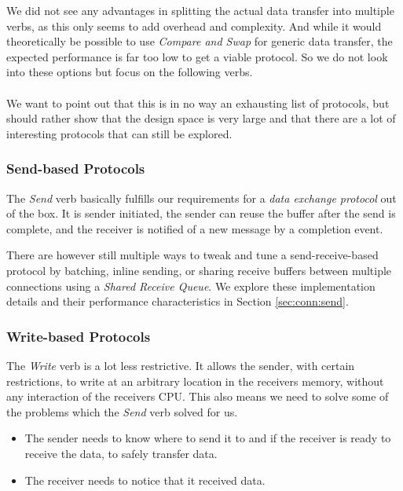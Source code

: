 We did not see any advantages in splitting the actual data transfer into multiple verbs, as this only seems to add overhead 
and complexity. And while it would theoretically be possible to use \emph{Compare and Swap} for generic data transfer,
the expected performance is far too low to get a viable protocol. So we do not look into these options but focus on the 
following verbs.

\paragraph{} We want to point out that this is in no way an exhausting list of protocols, but should rather show that the 
design space is very large and that there are a lot of interesting protocols that can still be explored.

\subsubsection{Send-based Protocols}
The \emph{Send} verb basically fulfills our requirements for a \emph{data exchange protocol} out of the box. It is sender
initiated, the sender can reuse the buffer after the send is complete, and the receiver is notified of a new message by
a completion event.

There are however still multiple ways to tweak and tune a send-receive-based protocol by batching, inline sending, or 
sharing receive buffers between multiple connections using a \emph{Shared Receive Queue}. We explore these implementation 
details and their performance characteristics in Section \ref{sec:conn:send}.

\subsubsection{Write-based Protocols}
The \emph{Write} verb is a lot less restrictive. It allows the sender, with certain restrictions, to write at an arbitrary 
location in the receivers memory, without any interaction of the receivers CPU. This also means we need to solve some of the 
problems which the \emph{Send} verb solved for us.

\begin{itemize}
  \item The sender needs to know where to send it to and if the receiver is ready to receive the data, to safely transfer data.

  \item The receiver needs to notice that it received data.
\end{itemize}

